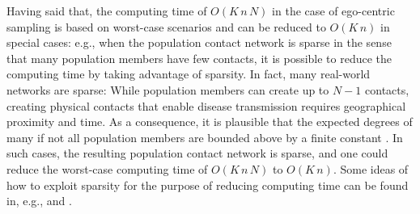 Having said that,
the computing time of $O(K\, n\, N)$ in the case of ego-centric sampling is based on worst-case scenarios and can be reduced to $O(K\, n)$ in special cases:
e.g.,
when the population contact network is sparse in the sense that many population members have few contacts,
it is possible to reduce the computing time by taking advantage of sparsity.
In fact,
many real-world networks are sparse:
While population members can create up to $N-1$ contacts,
creating physical contacts that enable disease transmission requires geographical proximity and time.
As a consequence,
it is plausible that the expected degrees of many if not all population members are bounded above by a finite constant \citep*{Du92,RoChYu11,KrHaMo11,Lo12,AmChBiLe13,KrKo14,butts:jms:2018}.
In such cases,
the resulting population contact network is sparse, 
and one could reduce the worst-case computing time of $O(K\, n\, N)$ to $O(K\, n)$.
Some ideas of how to exploit sparsity for the purpose of reducing computing time can be found in, e.g., \citet*{RaNiHoYe12} and \citet*{VuHuSc12}.
